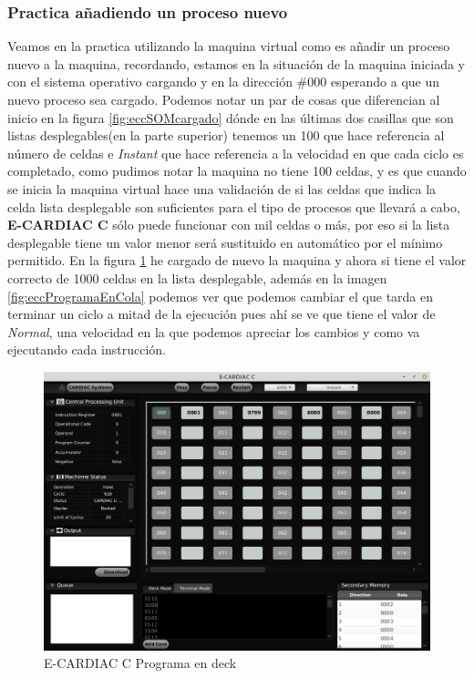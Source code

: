 \documentclass[letterpaper,12pt,oneside]{book}
\begin{document}
			
		
		\subsubsection{ Practica añadiendo un proceso nuevo }		
		
			Veamos en la practica utilizando la maquina virtual como es añadir un proceso nuevo a la maquina, recordando, estamos en la situación
			de la maquina iniciada y con el sistema operativo cargando y en la dirección \#000 esperando a que un nuevo proceso sea cargado. Podemos notar
			un par de cosas que diferencian al inicio en la figura \ref{fig:eccSOMcargado} dónde en las últimas dos casillas que
			son listas desplegables(en la parte superior) tenemos un 100 que hace referencia al número de celdas e \textit{Instant} que hace referencia
			a la velocidad en que cada ciclo es completado, como pudimos notar la maquina no tiene 100 celdas, y es que cuando se inicia la maquina virtual
			hace una validación de si las celdas que indica la celda lista desplegable son suficientes para el tipo de procesos que llevará a cabo, \textbf{E-CARDIAC C}
			sólo puede funcionar con mil celdas o más, por eso si la lista desplegable tiene un valor menor será sustituido en automático por el mínimo permitido. En
			la figura \ref{fig:eccProgramaenDeck} he cargado de nuevo la maquina y ahora si tiene el valor correcto de 1000 celdas en la lista desplegable, además
			en la imagen \ref{fig:eccProgramaEnCola} podemos ver que podemos cambiar el que tarda en terminar un ciclo a mitad de la ejecución pues ahí
			se ve que tiene el valor de \textit{Normal}, una velocidad en la que podemos apreciar los cambios y como va ejecutando cada instrucción.

		\begin{figure}[h]		
			\centering
			\includegraphics[scale=0.4]{media/CARDIACC/cardiaccProgramaEnDeck.png}
			\caption{E-CARDIAC C Programa en deck}
			\label{fig:eccProgramaenDeck}
		\end{figure}		
		
\end{document}
